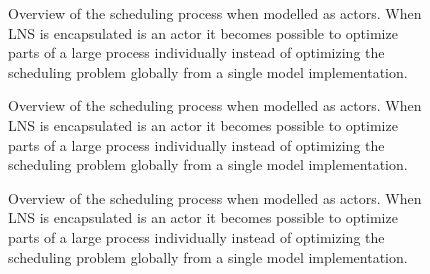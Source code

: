 \begin{figure}[H]
	\centering
	
	\resizebox{0.7\textwidth}{!}{
		\drawModelSetupHexagon[metaheuristics=true]
	}
	\caption{
		Overview of the scheduling process when modelled as actors. When LNS is encapsulated 
		is an actor it becomes possible to optimize parts of a large process individually instead of 
		optimizing the scheduling problem globally from a single model implementation.
	}
	\label{fig:ordinator-hexagon:metaheuristics}
\end{figure}

\begin{figure}[H]
	\centering
	
	\resizebox{0.7\textwidth}{!}{
		\drawModelSetupHexagon[orchestrator=true]
	}
	\caption{
		Overview of the scheduling process when modelled as actors. When LNS is encapsulated 
		is an actor it becomes possible to optimize parts of a large process individually instead of 
		optimizing the scheduling problem globally from a single model implementation.
	}
	\label{fig:ordinator-hexagon:orchestrator}
\end{figure}

\begin{figure}[H]
	\centering
	
	\resizebox{0.7\textwidth}{!}{
		\drawModelSetupHexagon[userinterface=true]
	}
	\caption{
		Overview of the scheduling process when modelled as actors. When LNS is encapsulated 
		is an actor it becomes possible to optimize parts of a large process individually instead of 
		optimizing the scheduling problem globally from a single model implementation.
	}
	\label{fig:ordinator-hexagon:userinterfaces}
\end{figure}

